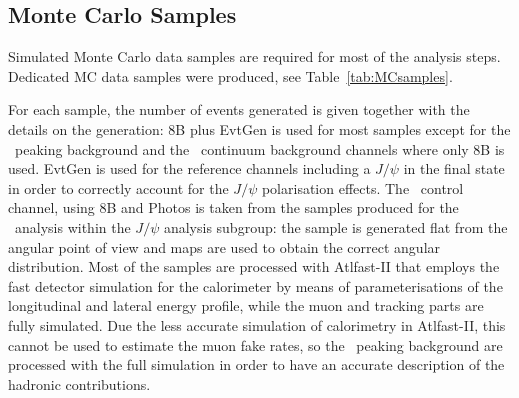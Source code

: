\subsection{Monte Carlo Samples}
\label{ssec:MCSamples}

Simulated Monte Carlo data samples are required for most of the analysis
steps. Dedicated MC data samples were produced, see
Table~\ref{tab:MCsamples}.

For each sample, the number of events generated is given together
with the details on the generation: \Pythia 8B plus EvtGen is used
for most samples except for the \Bhh\ peaking background and
the \bbmumuX\ continuum background channels where only \Pythia 8B is used.
EvtGen is used for the reference channels including a $J/\psi$ in the
final state in order to correctly account for the $J/\psi$
polarisation
effects.
The \BsJpsiPhi\ control channel, using \Pythia 8B and Photos is taken
from the samples produced for the \BsJpsiPhi\ analysis
within the {\it $J/\psi$} analysis subgroup: the sample is generated
flat from the angular point of view
and maps are used to obtain the correct angular distribution.
Most of the samples are processed with Atlfast-II that employs
the fast detector simulation for the calorimeter by means of
parameterisations of the longitudinal and lateral energy profile,
while the muon and tracking parts are fully simulated.
Due the less accurate simulation of calorimetry in Atlfast-II,
this cannot be used to estimate the muon fake rates, so
the \Bhh\ peaking background are
processed with the full simulation in order to have an accurate
description of the hadronic contributions.


